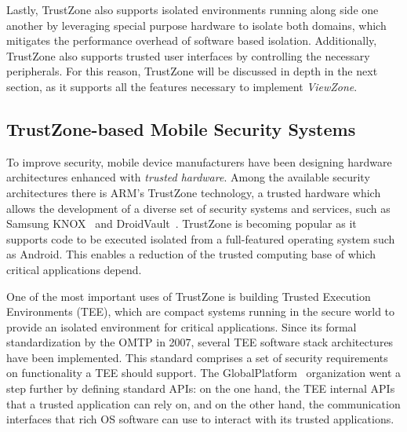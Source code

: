 Lastly, TrustZone also supports isolated environments running along side one another by leveraging special purpose hardware to isolate both domains, which mitigates the performance overhead of software based isolation. Additionally, TrustZone also supports trusted user interfaces by controlling the necessary peripherals. For this reason, TrustZone will be discussed in depth in the next section, as it supports all the features necessary to implement \emph{ViewZone}.

\subsection{TrustZone-based Mobile Security Systems}
\label{sec:trustzone}

To improve security, mobile device manufacturers have been designing hardware architectures enhanced with \emph{trusted hardware}. Among the available security architectures there is ARM's TrustZone technology, a trusted hardware which allows the development of a diverse set of security systems and services, such as Samsung KNOX~\cite{knox_whitepaper} and DroidVault~\cite{li2014droidvault}. TrustZone is becoming popular as it supports code to be executed isolated from a full-featured operating system such as Android. This enables a reduction of the trusted computing base of which critical applications depend.

One of the most important uses of TrustZone is building Trusted Execution Environments (TEE), which are compact systems running in the secure world to provide an isolated environment for critical applications. Since its formal standardization by the OMTP in 2007, several \ac{TEE} software stack architectures have been implemented. This standard comprises a set of security requirements on functionality a TEE should support. The GlobalPlatform~\cite{global} organization went a step further by defining standard APIs: on the one hand, the TEE internal APIs that a trusted application can rely on, and on the other hand, the communication interfaces that rich OS software can use to interact with its trusted applications.

